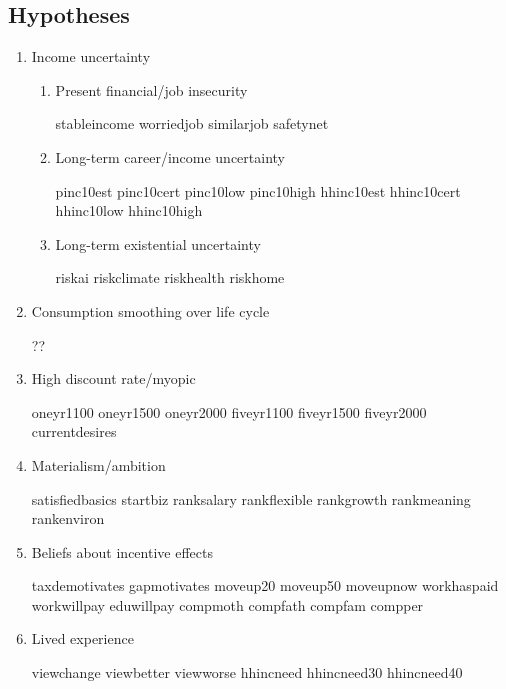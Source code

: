 \documentclass[12pt]{article}
\begin{document}
\subsection*{Hypotheses}

\begin{enumerate}

\item Income uncertainty
\begin{enumerate}
    \item Present financial/job insecurity

    stableincome worriedjob similarjob safetynet

    \item Long-term career/income uncertainty

    pinc10est pinc10cert pinc10low pinc10high hhinc10est hhinc10cert hhinc10low hhinc10high

    \item Long-term existential uncertainty

    riskai riskclimate riskhealth riskhome

\end{enumerate}

\item Consumption smoothing over life cycle

??

\item High discount rate/myopic

oneyr1100 oneyr1500 oneyr2000 fiveyr1100 fiveyr1500 fiveyr2000 currentdesires

\item Materialism/ambition

satisfiedbasics startbiz ranksalary rankflexible rankgrowth rankmeaning rankenviron

\item Beliefs about incentive effects

taxdemotivates gapmotivates moveup20 moveup50 moveupnow workhaspaid workwillpay eduwillpay compmoth compfath compfam compper 

\item Lived experience

viewchange viewbetter viewworse hhincneed hhincneed30 hhincneed40
    
\end{enumerate}

\end{document}
